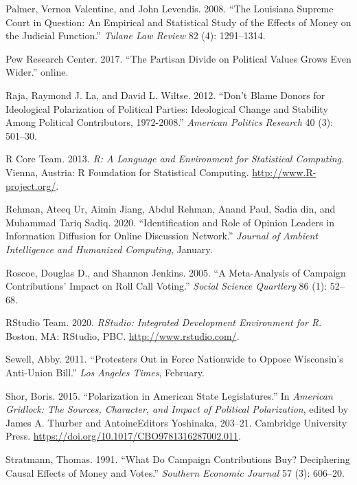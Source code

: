 \documentclass[12pt,]{article}
\begin{document}
\leavevmode\hypertarget{ref-palmer2008}{}%
Palmer, Vernon Valentine, and John Levendis. 2008. ``The Louisiana
Supreme Court in Question: An Empirical and Statistical Study of the
Effects of Money on the Judicial Function.'' \emph{Tulane Law Review} 82
(4): 1291--1314.

\leavevmode\hypertarget{ref-pew2017}{}%
Pew Research Center. 2017. ``The Partisan Divide on Political Values
Grows Even Wider.'' online.

\leavevmode\hypertarget{ref-laraja2011}{}%
Raja, Raymond J. La, and David L. Wiltse. 2012. ``Don't Blame Donors for
Ideological Polarization of Political Parties: Ideological Change and
Stability Among Political Contributors, 1972-2008.'' \emph{American
Politics Research} 40 (3): 501--30.

\leavevmode\hypertarget{ref-r}{}%
R Core Team. 2013. \emph{R: A Language and Environment for Statistical
Computing}. Vienna, Austria: R Foundation for Statistical Computing.
\url{http://www.R-project.org/}.

\leavevmode\hypertarget{ref-rehman2020}{}%
Rehman, Ateeq Ur, Aimin Jiang, Abdul Rehman, Anand Paul, Sadia din, and
Muhammad Tariq Sadiq. 2020. ``Identification and Role of Opinion Leaders
in Information Diffusion for Online Discussion Network.'' \emph{Journal
of Ambient Intelligence and Humanized Computing}, January.

\leavevmode\hypertarget{ref-roscoe2005}{}%
Roscoe, Douglas D., and Shannon Jenkins. 2005. ``A Meta-Analysis of
Campaign Contributions' Impact on Roll Call Voting.'' \emph{Social
Science Quartlery} 86 (1): 52--68.

\leavevmode\hypertarget{ref-rstudio}{}%
RStudio Team. 2020. \emph{RStudio: Integrated Development Environment
for R}. Boston, MA: RStudio, PBC. \url{http://www.rstudio.com/}.

\leavevmode\hypertarget{ref-sewell2011}{}%
Sewell, Abby. 2011. ``Protesters Out in Force Nationwide to Oppose
Wisconsin's Anti-Union Bill.'' \emph{Los Angeles Times}, February.

\leavevmode\hypertarget{ref-shor2015}{}%
Shor, Boris. 2015. ``Polarization in American State Legislatures.'' In
\emph{American Gridlock: The Sources, Character, and Impact of Political
Polarization}, edited by James A. Thurber and AntoineEditors Yoshinaka,
203--21. Cambridge University Press.
\url{https://doi.org/10.1017/CBO9781316287002.011}.

\leavevmode\hypertarget{ref-stratmann1991}{}%
Stratmann, Thomas. 1991. ``What Do Campaign Contributions Buy?
Deciphering Causal Effects of Money and Votes.'' \emph{Southern Economic
Journal} 57 (3): 606--20.
\end{document}
